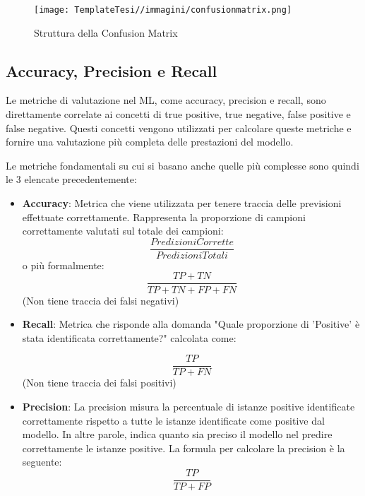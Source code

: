 \begin{flushleft}
\begin{figure}[H]
    \centering
    \texttt{[image: TemplateTesi//immagini/confusionmatrix.png]}
    \caption{Struttura della Confusion Matrix \cite{ImmConfusionMatrix}}
    \label{fig:confusionmatrix}
\end{figure}
\subsection{Accuracy, Precision e Recall}

Le metriche di valutazione nel ML, come accuracy, precision e recall, sono direttamente correlate ai concetti di true positive, true negative, false positive e false negative. Questi concetti vengono utilizzati per calcolare queste metriche e fornire una valutazione più completa delle prestazioni del modello.

Le metriche fondamentali su cui si basano anche quelle più complesse sono quindi le 3 elencate precedentemente:

\begin{itemize}
    \item \textbf{Accuracy}: Metrica che viene utilizzata per tenere traccia delle previsioni effettuate correttamente.
    Rappresenta la proporzione di campioni correttamente valutati sul totale dei campioni:
    \[\frac{Predizioni Corrette}{Predizioni Totali}\]
    o più formalmente:
    \[\frac{TP+TN}{TP+TN+FP+FN}\]
    (Non tiene traccia dei falsi negativi)
    
    \item \textbf{Recall}: Metrica che risponde alla domanda "Quale proporzione di 'Positive' è stata identificata correttamente?"
    calcolata come:

    \[\frac{TP}{TP+FN}\]
    (Non tiene traccia dei falsi positivi)


    \item \textbf{Precision}: La precision misura la percentuale di istanze positive identificate correttamente rispetto a tutte le istanze identificate come positive dal modello. In altre parole, indica quanto sia preciso il modello nel predire correttamente le istanze positive. 
    La formula per calcolare la precision è la seguente:
    \[\frac{TP}{TP+FP}\]

\end{itemize}


\end{flushleft}
